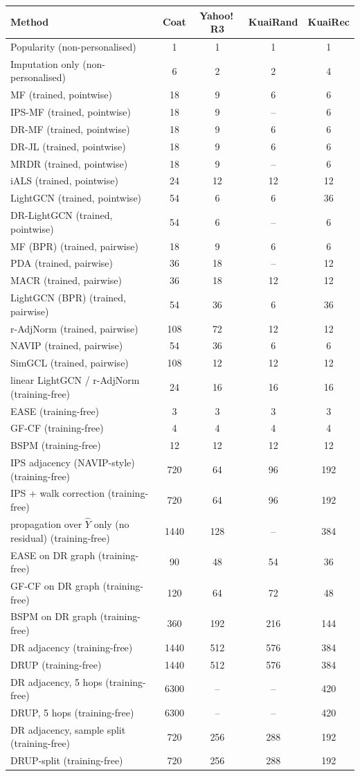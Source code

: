 \begin{tabular}{lcccc}
\toprule
Method & Coat & Yahoo!\,R3 & KuaiRand & KuaiRec\\
\midrule
Popularity (non-personalised) & 1 & 1 & 1 & 1\\
Imputation only (non-personalised) & 6 & 2 & 2 & 4\\
MF (trained, pointwise) & 18 & 9 & 6 & 6\\
IPS-MF (trained, pointwise) & 18 & 9 & -- & 6\\
DR-MF (trained, pointwise) & 18 & 9 & 6 & 6\\
DR-JL (trained, pointwise) & 18 & 9 & 6 & 6\\
MRDR (trained, pointwise) & 18 & 9 & -- & 6\\
iALS (trained, pointwise) & 24 & 12 & 12 & 12\\
LightGCN (trained, pointwise) & 54 & 6 & 6 & 36\\
DR-LightGCN (trained, pointwise) & 54 & 6 & -- & 6\\
MF (BPR) (trained, pairwise) & 18 & 9 & 6 & 6\\
PDA (trained, pairwise) & 36 & 18 & -- & 12\\
MACR (trained, pairwise) & 36 & 18 & 12 & 12\\
LightGCN (BPR) (trained, pairwise) & 54 & 36 & 6 & 36\\
r-AdjNorm (trained, pairwise) & 108 & 72 & 12 & 12\\
NAVIP (trained, pairwise) & 54 & 36 & 6 & 6\\
SimGCL (trained, pairwise) & 108 & 12 & 12 & 12\\
linear LightGCN / r-AdjNorm (training-free) & 24 & 16 & 16 & 16\\
EASE (training-free) & 3 & 3 & 3 & 3\\
GF-CF (training-free) & 4 & 4 & 4 & 4\\
BSPM (training-free) & 12 & 12 & 12 & 12\\
IPS adjacency (NAVIP-style) (training-free) & 720 & 64 & 96 & 192\\
IPS + walk correction (training-free) & 720 & 64 & 96 & 192\\
propagation over $\hat Y$ only (no residual) (training-free) & 1440 & 128 & -- & 384\\
EASE on DR graph (training-free) & 90 & 48 & 54 & 36\\
GF-CF on DR graph (training-free) & 120 & 64 & 72 & 48\\
BSPM on DR graph (training-free) & 360 & 192 & 216 & 144\\
DR adjacency (training-free) & 1440 & 512 & 576 & 384\\
DRUP (training-free) & 1440 & 512 & 576 & 384\\
DR adjacency, 5 hops (training-free) & 6300 & -- & -- & 420\\
DRUP, 5 hops (training-free) & 6300 & -- & -- & 420\\
DR adjacency, sample split (training-free) & 720 & 256 & 288 & 192\\
DRUP-split (training-free) & 720 & 256 & 288 & 192\\
\bottomrule
\end{tabular}
